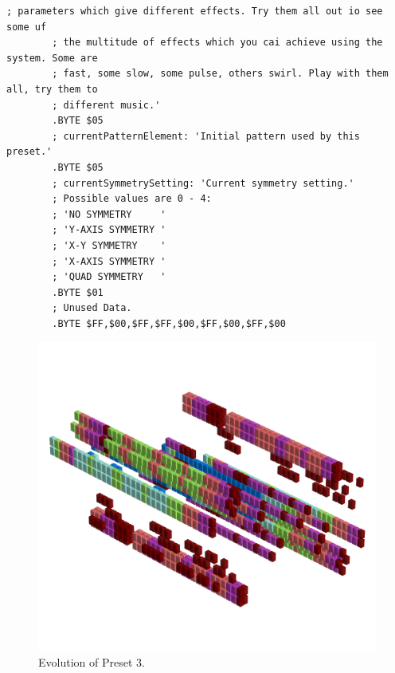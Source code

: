 \begin{lstlisting}[basicstyle=\ttfamily\tiny,caption=Source code for Preset 2.]
        ; parameters which give different effects. Try them all out io see some uf
        ; the multitude of effects which you cai achieve using the system. Some are
        ; fast, some slow, some pulse, others swirl. Play with them all, try them to
        ; different music.'
        .BYTE $05
        ; currentPatternElement: 'Initial pattern used by this preset.'
        .BYTE $05
        ; currentSymmetrySetting: 'Current symmetry setting.'
        ; Possible values are 0 - 4:
        ; 'NO SYMMETRY     '
        ; 'Y-AXIS SYMMETRY '
        ; 'X-Y SYMMETRY    '
        ; 'X-AXIS SYMMETRY '
        ; 'QUAD SYMMETRY   '
        .BYTE $01
        ; Unused Data.
        .BYTE $FF,$00,$FF,$FF,$00,$FF,$00,$FF,$00
\end{lstlisting}


\clearpage                                                                 
\begin{figure}[H]                                                          
    \centering                                                             
    \begin{adjustbox}{width=14cm,center}                                   
      \includegraphics[width=14cm]{src/presets/pattern3-45.png}%
    \end{adjustbox}                                                        
\caption{Evolution of Preset 3.}                                           
\end{figure}                                                               
\clearpage                                                                 
                                                                           
